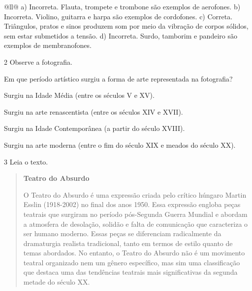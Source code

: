 \begin{itemize}
\begin{itemize}
\begin{escolha}[]{@{}ll@{}}
{a) Incorreta. Flauta, trompete e trombone são exemplos de aerofones.
b) Incorreta. Violino, guitarra e harpa são exemplos de cordofones.
c) Correta. Triângulos, pratos e sinos produzem som por meio da vibração 
de corpos sólidos, sem estar submetidos a tensão.
d) Incorreta. Surdo, tamborim e pandeiro são exemplos de membranofones.}

\num{2} Observe a fotografia.


Em que período artístico surgiu a forma de arte representada na fotografia?

\begin{escolha}
\item Surgiu na Idade Média (entre os séculos V e XV).

\item Surgiu na arte renascentista (entre os séculos XIV e XVII).

\item Surgiu na Idade Contemporânea (a partir do século XVIII).

\item Surgiu na arte moderna (entre o fim do século XIX e meados do século XX).
\end{escolha}


\num{3} Leia o texto.

\begin{quote}
\textbf{Teatro do Absurdo}

O Teatro do Absurdo é uma expressão criada pelo crítico húngaro Martin Esslin (1918-2002) 
no final dos anos 1950. Essa expressão engloba peças teatrais que surgiram no período 
pós-Segunda Guerra Mundial e abordam a atmosfera de desolação, solidão e falta de comunicação 
que caracteriza o ser humano moderno. Essas peças se diferenciam radicalmente da dramaturgia 
realista tradicional, tanto em termos de estilo quanto de temas abordados. No entanto, o 
Teatro do Absurdo não é um movimento teatral organizado nem um gênero específico, mas sim uma 
classificação que destaca uma das tendências teatrais mais significativas da segunda metade 
do século XX.


\end{quote}
\end{escolha}
\end{itemize}
\end{itemize}
